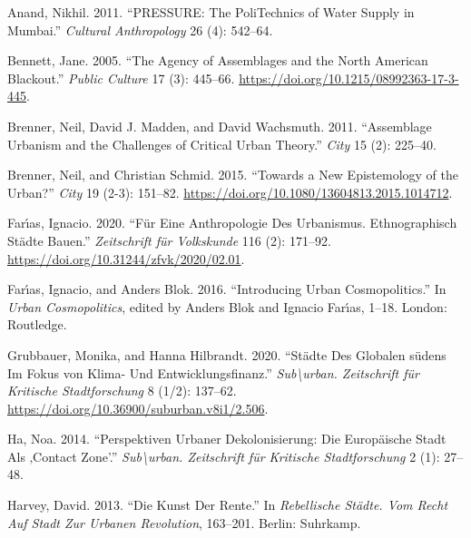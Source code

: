 \documentclass[
]{article}
\newlength{\cslhangindent}
\newlength{\cslentryspacingunit} %
\newenvironment{CSLReferences}[2] %
 {%
  \setlength{\parindent}{0pt}
  \ifodd #1
  \let\oldpar\par
  \def\par{\hangindent=\cslhangindent\oldpar}
  \fi
  \setlength{\parskip}{#2\cslentryspacingunit}
 }%
 {}
\begin{document}
\hypertarget{refs}{}
\begin{CSLReferences}{1}{0}
\leavevmode{}%
Anand, Nikhil. 2011. {``PRESSURE: The PoliTechnics of Water Supply in Mumbai.''} \emph{Cultural Anthropology} 26 (4): 542--64.

\leavevmode{}%
Bennett, Jane. 2005. {``The Agency of Assemblages and the North American Blackout.''} \emph{Public Culture} 17 (3): 445--66. \url{https://doi.org/10.1215/08992363-17-3-445}.

\leavevmode{}%
Brenner, Neil, David J. Madden, and David Wachsmuth. 2011. {``Assemblage Urbanism and the Challenges of Critical Urban Theory.''} \emph{City} 15 (2): 225--40.

\leavevmode{}%
Brenner, Neil, and Christian Schmid. 2015. {``Towards a New Epistemology of the Urban?''} \emph{City} 19 (2-3): 151--82. \url{https://doi.org/10.1080/13604813.2015.1014712}.

\leavevmode{}%
Farı́as, Ignacio. 2020. {``F{ü}r Eine Anthropologie Des Urbanismus. Ethnographisch St{ä}dte Bauen.''} \emph{Zeitschrift f{ü}r Volkskunde} 116 (2): 171--92. \url{https://doi.org/10.31244/zfvk/2020/02.01}.

\leavevmode{}%
Farı́as, Ignacio, and Anders Blok. 2016. {``Introducing Urban Cosmopolitics.''} In \emph{Urban Cosmopolitics}, edited by Anders Blok and Ignacio Farı́as, 1--18. London: Routledge.

\leavevmode{}%
Grubbauer, Monika, and Hanna Hilbrandt. 2020. {``St{ä}dte Des Globalen s{ü}dens Im Fokus von Klima- Und Entwicklungsfinanz.''} \emph{Sub\textbackslash urban. Zeitschrift f{ü}r Kritische Stadtforschung} 8 (1/2): 137--62. \url{https://doi.org/10.36900/suburban.v8i1/2.506}.

\leavevmode{}%
Ha, Noa. 2014. {``Perspektiven Urbaner Dekolonisierung: Die Europ{ä}ische Stadt Als ‚Contact Zone'.''} \emph{Sub\textbackslash urban. Zeitschrift f{ü}r Kritische Stadtforschung} 2 (1): 27--48.

\leavevmode{}%
Harvey, David. 2013. {``Die Kunst Der Rente.''} In \emph{Rebellische St{ä}dte. Vom Recht Auf Stadt Zur Urbanen Revolution}, 163--201. Berlin: Suhrkamp.


\end{CSLReferences}
\end{document}
